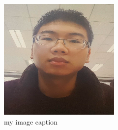 \documentclass[a4paper,twocolumn]{article}
\begin{document}
\begin{figure}
	\includegraphics[width=\linewidth, angle=0,]{1_1_09_2f_37.png}
	\caption{my image caption}
	\label{figrue of big cat} 
\end{figure}
\end{document}
